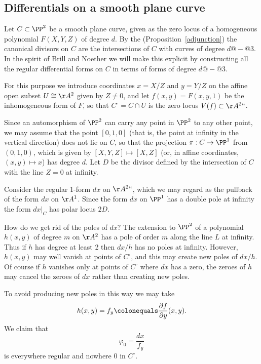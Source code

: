 \subsection{Differentials on a smooth plane curve}\label{canonical series on smooth plane curves}

Let $C \subset \PP^2$  be a smooth plane curve, given as the zero locus of a homogeneous polynomial $F(X,Y,Z)$ of degree $d$. By the 
%
(Proposition~\ref{adjunction}) the canonical  divisors on $C$
are the intersections of $C$ with curves of degree $d@{-}@3$. In the spirit of Brill and Noether we
will make this explicit by constructing all
 the 
regular differential forms
%
%
 on $C$ in terms of forms of degree $d@{-}@3$.

For this purpose we introduce coordinates $x = X/Z$ and $y = Y/Z$ on the affine open subset $U \cong \AA^2$ given by $Z \neq 0$, and let $f(x,y) = F(x, y,1)$ be the inhomogeneous form of $F$, so that $C^\circ = C \cap U$ is the zero locus $V(f) \subset  \AA^2` `$. 

Since an automorphism of $\PP^2$ can carry any point in $\PP^{2}$ to any other point, we may assume
that 
the point $[0,1,0]$ (that is, the point at infinity
in the vertical direction) does not lie on $C$, so that the
 projection  $\pi: C \to \PP^1$ from $(0,1,0)$, which is given by $[X,Y,Z] \mapsto [X,Z]$ (or, in affine coordinates, $(x,y) \mapsto x$)  has degree $d$. Let $D$ be the divisor defined by the intersection of $C$ with the line $Z=0$ at infinity.

Consider the
regular 1-form $dx$ on $\AA^2` `$, which we may regard as the pullback of the form $dx$ on
 $\AA^{1}$.
Since the form $dx$ on $\PP^{1}$ has a 
%
double pole
at infinity the form $dx|_{C}$ has polar
locus $2D$.
 
 \def\Co{{C^{\circ}}}
How do we get rid of the poles of $dx$? The extension to $\PP^2$ of a polynomial $h(x,y)$ of degree $m$ on
$\AA^2$ has a pole of order $m$ along the line $L$ at infinity. Thus if $h$ has degree at least 2 then $dx/h$ has no poles at infinity. However, $h(x,y)$ may well vanish at points of $\Co$, and this may create new poles of $dx/h$. Of course if $h$ vanishes only at  points of $\Co$ where $dx$ has a zero, the zeroes of $h$ may cancel the zeroes of $dx$ rather than creating new poles.
 
 To avoid producing new poles in this way we may take
 $$
 h(x,y) = f_{y} \colonequals \frac{\partial f}{\partial y}(x,y).
 $$
 We claim that 
 $$
\varphi_0 = \frac{dx}{f_{y}}
$$
is everywhere regular and nowhere 0 in $C^\circ$. 

